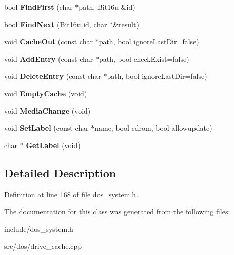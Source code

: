 \begin{DoxyCompactItemize}
\item 
\hypertarget{classDOS__Drive__Cache_ae19e2c7e6730d76b492bbc62d0edb38f}{bool {\bfseries Find\-First} (char $\ast$path, Bit16u \&id)}\label{classDOS__Drive__Cache_ae19e2c7e6730d76b492bbc62d0edb38f}

\item 
\hypertarget{classDOS__Drive__Cache_a8c3297b5ea4a5b10ccf1e9bfd6e4b2c6}{bool {\bfseries Find\-Next} (Bit16u id, char $\ast$\&result)}\label{classDOS__Drive__Cache_a8c3297b5ea4a5b10ccf1e9bfd6e4b2c6}

\item 
\hypertarget{classDOS__Drive__Cache_ac1cf68069ab790fb1b3a35686b3625c6}{void {\bfseries Cache\-Out} (const char $\ast$path, bool ignore\-Last\-Dir=false)}\label{classDOS__Drive__Cache_ac1cf68069ab790fb1b3a35686b3625c6}

\item 
\hypertarget{classDOS__Drive__Cache_a88416281f2c92dbd802bf1cc77153bdb}{void {\bfseries Add\-Entry} (const char $\ast$path, bool check\-Exist=false)}\label{classDOS__Drive__Cache_a88416281f2c92dbd802bf1cc77153bdb}

\item 
\hypertarget{classDOS__Drive__Cache_a68d34280ef1d383e84f98f2df46de333}{void {\bfseries Delete\-Entry} (const char $\ast$path, bool ignore\-Last\-Dir=false)}\label{classDOS__Drive__Cache_a68d34280ef1d383e84f98f2df46de333}

\item 
\hypertarget{classDOS__Drive__Cache_a37fc4a803fa8ac753d3e084ee52e0daf}{void {\bfseries Empty\-Cache} (void)}\label{classDOS__Drive__Cache_a37fc4a803fa8ac753d3e084ee52e0daf}

\item 
\hypertarget{classDOS__Drive__Cache_a6015de7335a108069e32a1fdebfcd890}{void {\bfseries Media\-Change} (void)}\label{classDOS__Drive__Cache_a6015de7335a108069e32a1fdebfcd890}

\item 
\hypertarget{classDOS__Drive__Cache_af5f0e25edd0f18d6ccaeb7349ec412a3}{void {\bfseries Set\-Label} (const char $\ast$name, bool cdrom, bool allowupdate)}\label{classDOS__Drive__Cache_af5f0e25edd0f18d6ccaeb7349ec412a3}

\item 
\hypertarget{classDOS__Drive__Cache_a5226fd65de22dc1ed73103dce3b6d668}{char $\ast$ {\bfseries Get\-Label} (void)}\label{classDOS__Drive__Cache_a5226fd65de22dc1ed73103dce3b6d668}

\end{DoxyCompactItemize}


\subsection{Detailed Description}


Definition at line 168 of file dos\-\_\-system.\-h.



The documentation for this class was generated from the following files\-:\begin{DoxyCompactItemize}
\item 
include/dos\-\_\-system.\-h\item 
src/dos/drive\-\_\-cache.\-cpp\end{DoxyCompactItemize}
